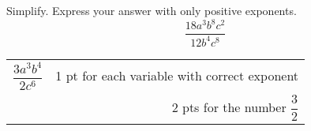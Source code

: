 {
	Simplify.  Express your answer with only positive exponents.  $$\dfrac{18a^3b^8c^2}{12b^4c^8}$$
}
{
	\begin{tabular}{l r}
	$\dfrac{3a^3b^4}{2c^6}$ &   1 pt for each variable with correct exponent \\
	& 2 pts for the number $\dfrac{3}{2}$
	\end{tabular}
}
